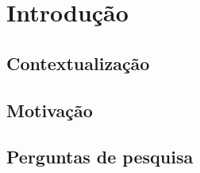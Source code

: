 
\chapter{Introdu\c{c}\~ao}
\label{cap:introducao}

\section{Contextualiza\c{c}\~ao}
\label{sec:contexto}

%
%

\section{Motiva\c{c}\~ao}
\label{sec:motivacao}

%
%

\section{Perguntas de pesquisa}
\label{sec:rqs}

%

